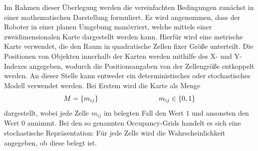 Im Rahmen dieser Überlegung werden die vereinfachten Bedingungen zunächst in einer mathematischen Darstellung formuliert. Es wird angenommen, dass der Roboter in einer planen Umgebung manövriert, welche mittels einer zweidimensionalen Karte dargestellt werden kann. Hierfür wird eine metrische Karte verwendet, die den Raum in quadratische Zellen fixer Größe unterteilt. Die Positionen von Objekten innerhalb der Karten werden mithilfe des X- und Y-Indexes angegeben, wodurch die Positionsangaben von der Zellengröße entkoppelt werden. An dieser Stelle kann entweder ein deterministisches oder stochastisches Modell verwendet werden. Bei Erstem wird die Karte als Menge
\begin{equation}
M = \left\{m_{ij}\right\} \hspace{3.cm} m_{ij} \in \left\{0, 1\right\}
\end{equation}
dargestellt, wobei jede Zelle $m_{ij}$ im belegten Fall den Wert $1$ und ansonsten den Wert $0$ annimmt. Bei den so genannten Occupancy-Grids handelt es sich eine stochastische Repräsentation: Für jede Zelle wird die Wahrscheinlichkeit angegeben, ob diese belegt ist. 


